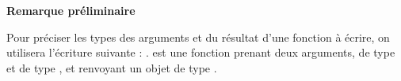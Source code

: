 
\textbf{Remarque préliminaire}

Pour préciser les types des arguments et du résultat d'une fonction à écrire, on utilisera l'écriture suivante : 
.  est une fonction prenant deux arguments,  de type  et  de type , et renvoyant un objet de type .








%
%
%
%
